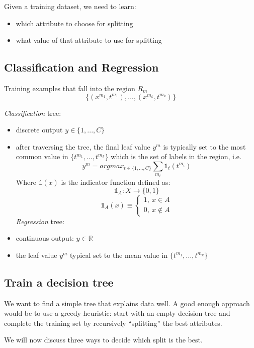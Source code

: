 \documentclass[11pt]{article}
\begin{document}
Given a training dataset, we need to learn:

\begin{itemize}
\tightlist
\item
  which attribute to choose for splitting
\item
  what value of that attribute to use for splitting
\end{itemize}

\subsection{Classification and
Regression}\label{classification-and-regression}

Training examples that fall into the region \(R_m\)
\[\{ (x^{m_1}, t^{m_1}),...,(x^{m_k}, t^{m_k}) \}\]

\emph{Classification} tree:

\begin{itemize}
\item
  discrete output \(y \in \{1, ..., C\}\)
\item
  after traversing the tree, the final leaf value \(y^m\) is typically
  set to the most common value in \(\{t^{m_1}, ..., t^{m_k}\}\) which is
  the set of labels in the region, i.e.
  \[y^m = argmax_{t\in \{ 1, ..., C \}} \sum_{m_i}\mathbb{1}_{t} (t^{m_i}) \]
  Where \(\mathbb{1} (x)\) is the indicator function defined as:
  \[\mathbb{1}_A: X\rightarrow \{ 0, 1 \}\] \[\mathbb{1}_A(x) \equiv
  \begin{cases}
  1,\ x\in A \\
  0,\ x \notin A
  \end{cases}\] \emph{Regression} tree:
\item
  continuous output: \(y\in \mathbb{R}\)
\item
  the leaf value \(y^m\) typical set to the mean value in
  \(\{t^{m_1},...,t^{m_k}\}\)
\end{itemize}

\subsection{Train a decision tree}\label{train-a-decision-tree}

We want to find a simple tree that explains data well. A good enough
approach would be to use a greedy heuristic: start with an empty
decision tree and complete the training set by recursively ``splitting''
the best attributes.

We will now discuss three ways to decide which split is the best.
\end{document}
